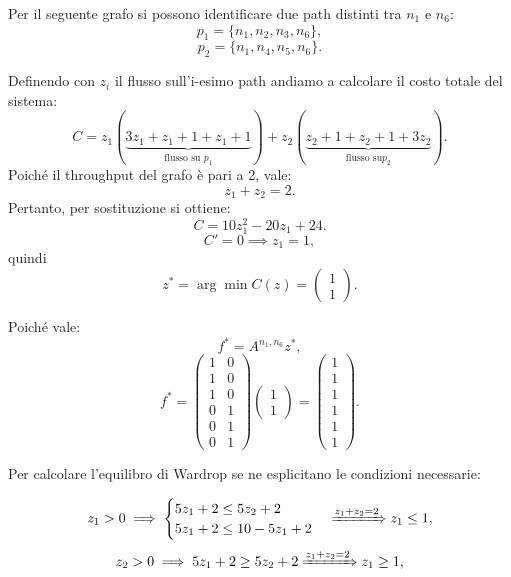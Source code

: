 \begin{alphaparts}

    \questionpart

    Per il seguente grafo si possono identificare due path distinti tra \(n_1\) e \(n_6\):
    \[p_1 = \{n_1, n_2, n_3, n_6\},\]
    \[p_2 = \{n_1, n_4, n_5, n_6\}.\]

    Definendo con \(z_i\) il flusso sull'i-esimo path andiamo a calcolare il costo totale del sistema:
    \[C = z_1(\underbrace{3z_1+ z_1+ 1+ z_1+ 1}_{ \text{flusso su }p_1})+ z_2(\underbrace{z_2+ 1 +z_2+ 1 + 3z_2}_{ \text{flusso su} p_2}).\]
    Poiché il throughput del grafo è pari a 2, vale:
    \[z_1+ z_2 = 2.\]
    Pertanto, per sostituzione si ottiene:
    \[C = 10z_1^2 - 20z_1 + 24. \]
    \[C' = 0 \implies z_1 = 1,\]
    quindi
    \[z^* = \arg\min C(z) = \begin{pmatrix}
        1\\
        1
    \end{pmatrix}.  \]

    Poiché vale:
    \[ f^* = A^{n_1,n_6}z^*,\]
    \[ f^* = \begin{pmatrix}
        1 & 0 \\
        1 & 0 \\
        1 & 0 \\
        0 & 1 \\
        0 & 1 \\
        0 & 1 
    \end{pmatrix} \begin{pmatrix} 1 \\ 1 \end{pmatrix}
     = \begin{pmatrix}
        1 \\ 1 \\ 1 \\ 1 \\ 1 \\ 1
    \end{pmatrix}. \]


    \questionpart
    
    Per calcolare l'equilibro di Wardrop se ne esplicitano le condizioni necessarie:

    \[z_1 > 0 \implies \begin{cases} 5z_1 + 2 \leq 5z_2 + 2 \\ 5z_1 + 2 \leq 10- 5z_1 + 2 \end{cases} \xRightarrow[]{z_1+ z_2= 2} z_1 \leq 1,\]
    \[ z_2 > 0 \implies 5z_1 + 2 \geq 5z_2 + 2 \xRightarrow[]{z_1+ z_2= 2} z_1 \geq 1, \]


\end{alphaparts}
